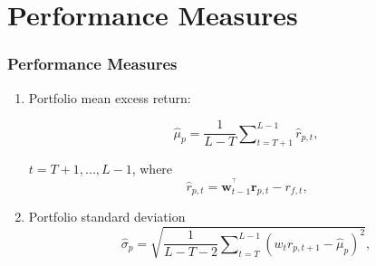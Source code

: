 \documentclass[pdf,9pt,xcolor=dvipsnames,hide notes]{beamer}
\begin{document}
\section{Performance Measures}

\begin{frame}
\frametitle{Performance Measures}

%
%
%
%

	\begin{enumerate}
	\setcounter{enumi}{0}

\item Portfolio mean excess return:

\begin{equation}
\widehat{\mu }_{p}=\frac{1}{L-T}\sum\nolimits_{t=T+1}^{L-1}\widehat{r}_{p,t},
\end{equation}

$t=T+1,...,L-1$, where 
\begin{equation}
\widehat{r}_{p,t}=\mathbf{w}_{t-1}^{^{\top }}\mathbf{r}_{p,t}-r_{f,t}\text{,}
\end{equation}%

\vspace{0.3cm}

\item Portfolio standard deviation 
\begin{equation}
\widehat{\sigma }_{p}=\sqrt{\frac{1}{L-T-2}\sum\nolimits_{t=T}^{L-1}\left(
	w_{t}r_{p,t+1}-\widehat{\mu }_{p}\right) ^{2}},
\end{equation}%

\end{enumerate}

\end{frame}
\end{document}

